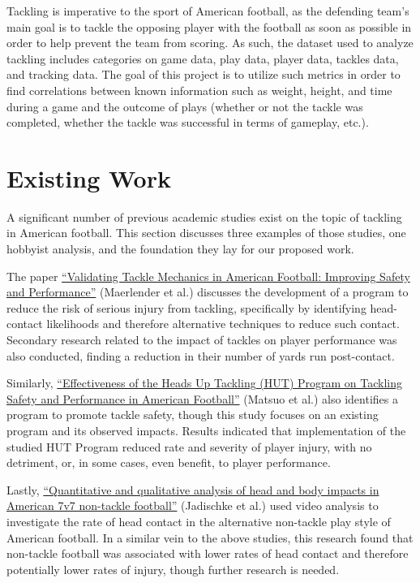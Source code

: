 \documentclass[bibtex, sigconf, hyperref={colorlinks=true,linkcolor=blue,urlcolor=blue}]{acmart}
\begin{document}
Tackling is imperative to the sport of American football, as the defending team's main goal is to tackle the opposing player with the football as soon as possible in order to help prevent the team from scoring. As such, the dataset used to analyze tackling includes categories on game data, play data, player data, tackles data, and tracking data. The goal of this project is to utilize such metrics in order to find correlations between known information such as weight, height, and time during a game and the outcome of plays (whether or not the tackle was completed, whether the tackle was successful in terms of gameplay, etc.).

\section{Existing Work}
A significant number of previous academic studies exist on the topic of
tackling in American football. This section discusses three examples of those
studies, one hobbyist analysis, and the foundation they lay for our proposed
work.

The paper \href{https://link.springer.com/article/10.1007/s10439-020-02625-7}{“Validating Tackle
Mechanics in American Football: Improving Safety and Performance”}\cite{validatingtackles} (Maerlender et al.) discusses the
development of a program to reduce the risk of serious injury from tackling, specifically by identifying
head-contact likelihoods and therefore alternative techniques to reduce such contact. Secondary research
related to the impact of tackles on player performance was also conducted, finding a reduction in
their number of yards run post-contact.

Similarly, \href{https://www.jstage.jst.go.jp/article/ijshs/16/0/16_201804/_article/-char/ja/}
{“Effectiveness of the Heads Up Tackling (HUT) Program on Tackling Safety and Performance in American Football”}\cite{effectiveness}
(Matsuo et al.) also identifies a program to promote tackle safety, though this study focuses
on an existing program and its observed impacts. Results indicated that implementation of the
studied HUT Program reduced rate and severity of player injury, with no detriment, or, in some
cases, even benefit, to player performance.

Lastly, \href{https://bmjopensem.bmj.com/content/6/1/e000638.abstract}{“Quantitative and qualitative
analysis of head and body impacts in American 7v7 non-tackle football”}\cite{quantitative} (Jadischke et al.) used video
analysis to investigate the rate of head contact in the alternative non-tackle play style of
American football. In a similar vein to the above studies, this research found that non-tackle
football was associated with lower rates of head contact and therefore potentially lower rates of
injury, though further research is needed.
\end{document}
